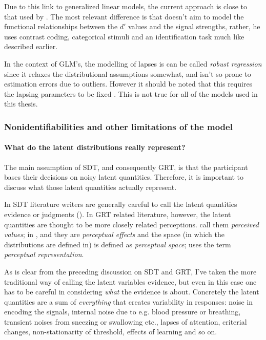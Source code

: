\documentclass{article}\usepackage{knitr}
\begin{document}
Due to this link to generalized linear models, the current approach is close to that used by \cite{cohen2003}. The most relevant difference is that \citeauthor{cohen2003} doesn't aim to model the functional relationships between the $d'$ values and the signal strengths, rather, he uses contrast coding, categorical stimuli and an identification task much like described earlier.

In the context of GLM's, the modelling of lapses is can be called \textit{robust regression} \citep[p. 635]{kruschke2015} since it relaxes the distributional assumptions somewhat, and isn't so prone to estimation errors due to outliers. However it should be noted that this requires the lapsing parameters to be fixed \citep[p. ERROR]{skrondahl2004}. This is not true for all of the models used in this thesis.

\subsubsection{Nonidentifiabilities and other limitations of the model}

\paragraph{What do the latent distributions really represent?}

The main assumption of SDT, and consequently GRT, is that the participant bases their decisions on noisy latent quantities. Therefore, it is important to discuss what those latent quantities actually represent.  

In SDT literature writers are generally careful to call the latent quantities evidence \citep{wickens2002, verde2006} or judgments (\citealp[p. 247]{stigler2003}). In GRT related literature, however, the latent quantities are thought to be more closely related perceptions. \cite{ashby2015} call them \textit{perceived values}; in \cite{ashby1986},  \cite{kadlec1992} and \cite{silbert2009} they are \textit{perceptual effects} and the space (in which the distributions are defined in) is defined as \textit{perceptual space}; \cite{soto2017} uses the term \textit{perceptual representation}.

As is clear from the preceding discussion on SDT and GRT, I've taken the more traditional way of calling the latent variables evidence, but even in this case one has to be careful in considering \textit{what} the evidence is about. Concretely the latent quantities are a sum of \textit{everything} that creates variability in responses: noise in encoding the signals, internal noise due to e.g. blood pressure or breathing, transient noises from sneezing or swallowing etc., lapses of attention, criterial changes, non-stationarity of threshold, effects of learning and so on. 
\end{document}
